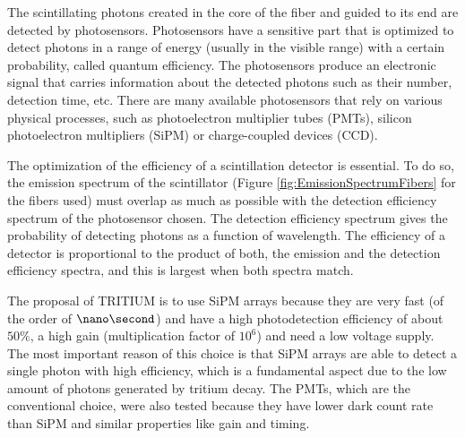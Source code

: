 The scintillating photons created in the core of the fiber and guided to its end are detected by photosensors. Photosensors have a sensitive part that is optimized to detect photons in a range of energy (usually in the visible range) with a certain probability, called quantum efficiency. The photosensors produce an electronic signal that carries information about the detected photons such as their number, detection time, etc. There are many available photosensors that rely on various physical processes, such as photoelectron multiplier tubes (PMTs), silicon photoelectron multipliers (SiPM) or charge-coupled devices (CCD).  %

The optimization of the efficiency of a scintillation detector is essential. To do so, the emission spectrum of the scintillator (Figure \ref{fig:EmissionSpectrumFibers} for the fibers used) must overlap as much as possible with the detection efficiency spectrum of the photosensor chosen. The detection efficiency spectrum gives the probability of detecting photons as a function of wavelength. The efficiency of a detector is proportional to the product of both, the emission and the detection efficiency spectra, and this is largest when both spectra match.

The proposal of TRITIUM is to use SiPM arrays because they are very fast (of the order of $\nano\second$) and have a high photodetection efficiency of about $50\%$, a high gain (multiplication factor of $10^{6}$) and need a low voltage supply. The most important reason of this choice is that SiPM arrays are able to detect a single photon with high efficiency, which is a fundamental aspect due to the low amount of photons generated by tritium decay. The PMTs, which are the conventional choice, were also tested because they have lower dark count rate than SiPM and similar properties like gain and timing.




